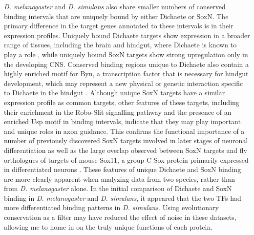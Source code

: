 \emph{D. melanogaster} and \emph{D. simulans} also share smaller numbers of conserved binding intervals that are uniquely bound by either Dichaete or SoxN. The primary difference in the target genes annotated to these intervals is in their expression profiles. Uniquely bound Dichaete targets show expression in a broader range of tissues, including the brain and hindgut, where Dichaete is known to play a role \citep{sanchez-soriano_regulatory_2000}, while uniquely bound SoxN targets show strong upregulation only in the developing CNS. Conserved binding regions unique to Dichaete also contain a highly enriched motif for Byn, a transcription factor that is necessary for hindgut development, which may represent a new physical or genetic interaction specific to Dichaete in the hindgut \citep{kispert_homologs_1994,murakami_developmental_1999}. Although unique SoxN targets have a similar expression profile as common targets, other features of these targets, including their enrichment in the Robo-Slit signalling pathway and the presence of an enriched Usp motif in binding intervals, indicate that they may play important and unique roles in axon guidance. This confirms the functional importance of a number of previously discovered SoxN targets involved in later stages of neuronal differentiation as well as the large overlap observed between SoxN targets and fly orthologues of targets of mouse Sox11, a group C Sox protein primarily expressed in differentiated neurons \citep{bergsland_sequentially_2011,ferrero_soxneuro_2014}. These features of unique Dichaete and SoxN binding are more clearly apparent when analyzing data from two species, rather than from \emph{D. melanogaster} alone. In the initial comparison of Dichaete and SoxN binding in \emph{D. melanogaster} and \emph{D. simulans}, it appeared that the two TFs had more differentiated binding patterns in \emph{D. simulans}. Using evolutionary conservation as a filter may have reduced the effect of noise in these datasets, allowing me to home in on the truly unique functions of each protein.

